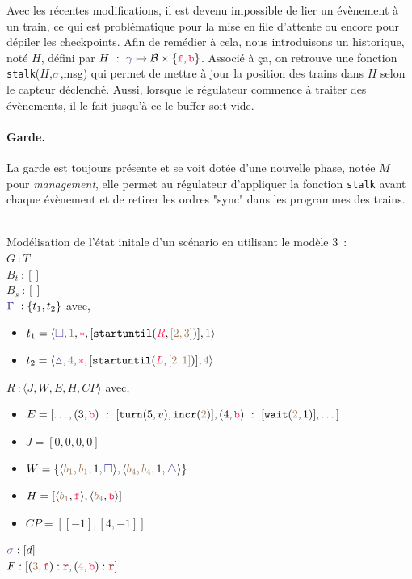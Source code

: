 \documentclass[oneside, a4paper, 11pt]{book}
\newcommand{\trainFmt}[1]{{\color{traincolor} #1}}
\newcommand{\trainTupleMF}[5]{\langle \trainFmt{#1}, \posFmt{#2}, \dirFmt{#3}, #4, \posFmt{#5} \rangle}
\newcommand{\forward}{\ensuremath{\mathtt{f}}}
\newcommand{\backward}{\ensuremath{\mathtt{b}}}
\newcommand{\dirFmt}[1]{{\color{dircolor} #1}}
\newcommand{\dirForward}{\ensuremath{\dirFmt{\forward}}}
\newcommand{\dirBackward}{\ensuremath{\dirFmt{\backward}}}
\newcommand{\posFmt}[1]{{\color{poscolor}{#1}}}
\newcommand{\bid}[1]{\ensuremath{\posFmt{b_{#1}}}}
\newcommand{\su}[2]{{\mbox{$\mathtt{startuntil}(\dirFmt{#1}, \posFmt{#2})$}}}
\newcommand{\incr}[1]{{\mbox{\ensuremath{\mathtt{incr}(\posFmt{#1})}}}}
\newcommand{\turnOrder}[2]{{\mbox{\ensuremath{\mathtt{turn}(#1, #2)}}}}
\newcommand{\wait}[2]{{\mbox{\ensuremath{\mathtt{wait}(\posFmt{#1}, #2)}}}}
\newcommand{\swFmt}[1]{{\color{swcolor}{#1}}}
\newcommand{\sigred}{{\mbox{${\color{red!50!black}\mathtt{r}}$}}}
\newcommand{\commentaire}[1]{{\color{commentcolor}{#1}}}
\begin{document}
Avec les récentes modifications, il est devenu impossible de lier un évènement à un train, ce qui est problématique pour la mise en file d'attente ou encore pour dépiler les checkpoints. Afin de remédier à cela, nous introduisons un historique, noté $H$, défini par $H~:~\trainFmt{\gamma} \mapsto \mathcal{B} \times \{\dirForward, \dirBackward\} $. Associé à ça, on retrouve une fonction \texttt{stalk}($H$,$\swFmt{\sigma}$,msg) qui permet de mettre à jour la position des trains dans $H$ selon le capteur déclenché.
Aussi, lorsque le régulateur commence à traiter des évènements, il le fait jusqu'à ce le buffer soit vide.


\paragraph{Garde.} La garde est toujours présente et se voit dotée d'une nouvelle phase, notée $M$ pour \textit{management}, elle permet au régulateur d'appliquer la fonction \texttt{stalk} avant chaque évènement et de retirer les ordres "sync" dans les programmes des trains.

\begin{example}[GoodEnding M3]
		~\\
	Modélisation de l'état initale d'un scénario en utilisant le modèle 3~:
	\\$G~: T$
	\vspace{0.3cm}
	\\$B_t~: []$ \commentaire{// vide}
	\vspace{0.3cm}
	\\$B_s~: []$ \commentaire{// vide}
	\vspace{0.3cm}
	\\$\trainFmt{\Gamma}~: \{t_1, t_2\}$ avec,
	\begin{itemize}
		\item[] $t_1 = \trainTupleMF{\square}{1}{*}{[\su{R}{[2,3]}]}{1}$
		\item[] $t_2 = \trainTupleMF{\vartriangle}{4}{*}{[\su{L}{[2,1]}]}{4}$
	\end{itemize}
	\vspace{0.3cm}
	$R~: \langle J,W,E,H,CP \rangle$ avec,	
	\begin{itemize}
		\item[] $E = [\dots,(3,\dirBackward)~:~[\turnOrder{5}{v}, \incr{2}], (4,\dirBackward)~:~[\wait{2}{1}],\dots]$
		\item[] $J = [0,0,0,0]$
		\item[] $W = \{\langle \bid{1}, \bid{1}, 1, \trainFmt{\square} \rangle, \langle \bid{4}, \bid{4}, 1, \trainFmt{\triangle} \rangle\}$
		\item[] $H = [\langle \bid{1}, \dirForward \rangle, \langle \bid{4}, \dirBackward \rangle]$
		\item[] $CP = [[-1],[4,-1]]$
	\end{itemize}
	\vspace{0.3cm}
	$\swFmt{\sigma} : [d]$
	\vspace{0.3cm}
	\\$F : [(\posFmt{3},\dirForward) : \sigred,(\posFmt{4},\dirBackward) : \sigred]$ \commentaire{// De base, tous les feux sont au vert}
\end{example}
\end{document}
